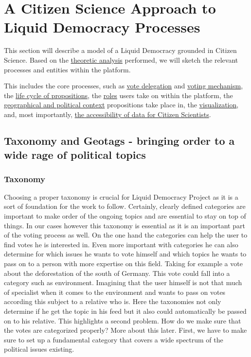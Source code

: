 \chapter{A Citizen Science Approach to Liquid Democracy Processes}
\label{ch:Approach}

This section will describe a model of a Liquid Democracy grounded in Citizen Science. Based on the \hyperref[ch:Theory]{theoretic analysis} performed, we will sketch the relevant processes and entities within the platform. 

This includes the core processes, such as \hyperref[sec:Model_VoteDelegation]{vote delegation} and \hyperref[sec:Voting_Mechanism]{voting mechanism}, the \hyperref[sec:Model_Propositions]{life cycle of propositions}, the \hyperref[sec:UserRoles]{roles} users take on within the platform, the \hyperref[sec:Model_Contexts]{geographical and political context} propositions take place in, the \hyperref[sec:Model_Visualization]{visualization}, and, most importantly, \hyperref[sec:Model_ResearchersAccess]{the accessibility of data for Citizen Scientists}. 

\section{Taxonomy and Geotags - bringing order to a wide rage of political topics}
\label{sec:Model_Contexts}
\subsection{Taxonomy}
Choosing a proper taxonomy is crucial for Liquid Democracy Project as it is a sort of foundation for the work to follow. Certainly, clearly defined categories are important to make order of the ongoing topics and are essential to stay on top of things. In our cases however this taxonomy is essential as it is an important part of the voting process as well. On the one hand the categories can help the user to find votes he is interested in. Even more important with categories he can also determine for which issues he wants to vote himself and which topics he wants to pass on to a person with more expertise on this field. Taking for example a vote about the deforestation of the south of Germany. This vote could fall into a category such as environment. Imagining that the user himself is not that much of specialist when it comes to the environment and wants to pass on votes according this subject to a relative who is. Here the taxonomies not only determine if he get the topic in his feed but it also could automatically be passed on to his relative. This highlights a second problem. How do we make sure that the votes are categorized properly? More about this later. First, we have to make sure to set up a fundamental category that covers a wide spectrum of the political issues existing.

